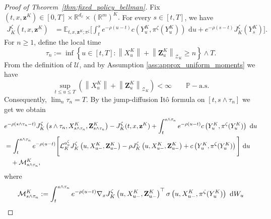 \documentclass[11pt]{article}
\theoremstyle{remarkitalic}
\theoremstyle{remarkitalic}
\newcommand{\E}{\mathbb E}
\newcommand{\dd}{\,\mathrm d}
\newcommand{\1}{\mathbf 1}
\newcommand{\norm}[1]{\left\lVert #1 \right\rVert}
\begin{document}
\begin{proof}[Proof of Theorem~\ref{thm:fixed_policy_bellman}]
Fix
$ (t,x,\mathbf z^K)
    \in
    [0,T]\times
    \mathbb R^{d_x}\times(\mathbb R^m)^K.$ For every $s\in[t,T]$, we have 
\begin{align}
    J_K^\zeta(t,x,\mathbf z^K)
    &=
    \E_{t,x,\mathbf z^K;\pi^\zeta}
    \Bigg[
        \int_t^s
        e^{-\rho(u-t)}
        c\left(
            Y_u^K,\pi^\zeta(Y_u^K)
        \right)
        \,\dd u
        +
        e^{-\rho(s-t)}
        J_K^\zeta
        \left(
           Y_s^K
        \right)
    \Bigg].
    \label{eq:fixed_policy_dpp_bold}
\end{align}
For $n\ge1$, define the local time
\[
    \tau_n
    :=
    \inf\left\{
        u\in[t,T]:
        \norm{X_u^K}
        +
        \norm{\mathbf Z_u^K}_{\mathcal Z_K}
        \ge n
    \right\}
    \wedge T.
\]
From the definition of $\mathcal U$, and by Assumption \ref{ass:approx_uniform_moments} we have
\[
    \sup_{t\le u\le T}
    \left(
        \norm{X_u^K}
        +
        \norm{\mathbf Z_u^K}_{\mathcal Z_K}
    \right)
    <\infty
    \qquad\mathbb P-\text{a.s.}
\]
Consequently, $\lim_n\tau_n=T$.
By the jump-diffusion It\^o formula on
$[t,s\wedge\tau_n]$ we get
we obtain
\begin{align*}
    &
    e^{-\rho(s\wedge\tau_n-t)}
    J_K^\zeta
    \left(
        s\wedge\tau_n,
        X_{s\wedge\tau_n}^K,
        \mathbf Z_{s\wedge\tau_n}^K
    \right)
    -
    J_K^\zeta(t,x,\mathbf z^K)+\int_t^{s\wedge\tau_n}
        e^{-\rho(u-t)}
        c\left(
            Y_u^K,\pi^\zeta(Y_u^K)
        \right)
        \,\dd u
    \notag\\
    &=
    \int_t^{s\wedge\tau_n}
    e^{-\rho(u-t)}
    \Bigg[
        \mathcal L_K^{a_u^\zeta}
        J_K^\zeta
        \left(
            u,X_{u-}^K,\mathbf Z_{u-}^K
        \right)
        -
        \rho
        J_K^\zeta
        \left(
            u,X_{u-}^K,\mathbf Z_{u-}^K
        \right) +
        c\left(
            Y_u^K,\pi^\zeta(Y_u^K)
        \right)
    \Bigg] \,\dd u\notag \\
    &\quad +
    \mathcal M_{s\wedge\tau_n}^{K},
\end{align*}
where
\begin{align*}
    &\mathcal M_{s\wedge\tau_n}^{K}
    :=
    \int_t^{s\wedge\tau_n}
    e^{-\rho(u-t)}
    \nabla_xJ_K^\zeta
    \left(
        u,X_{u-}^K,\mathbf Z_{u-}^K
    \right)^\top
    \sigma
    \left(
        u,X_{u-}^K,\pi^\zeta(Y_u^K)
    \right)
    \,\dd W_u
    \notag\\

\end{align*}
\end{proof}
\end{document}

